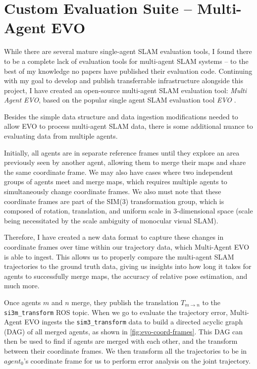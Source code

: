 \section{Custom Evaluation Suite – Multi-Agent EVO}
\label{sec:multi-agent-evo}
While there are several mature single-agent SLAM evaluation tools, I found there to be a complete lack of evaluation tools for multi-agent SLAM systems – to the best of my knowledge no papers have published their evaluation code. Continuing with my goal to develop and publish transferrable infrastructure alongside this project, I have created an open-source multi-agent SLAM evaluation tool: \textit{Multi Agent EVO}, based on the popular single agent SLAM evaluation tool \textit{EVO} \autocite{grupp2017evo}.

Besides the simple data structure and data ingestion modifications needed to allow EVO to process multi-agent SLAM data, there is some additional nuance to evaluating data from multiple agents.

Initially, all agents are in separate reference frames until they explore an area previously seen by another agent, allowing them to merge their maps and share the same coordinate frame. We may also have cases where two independent groups of agents meet and merge maps, which requires multiple agents to simultaneously change coordinate frames. We also must note that these coordinate frames are part of the SIM(3) transformation group, which is composed of rotation, translation, and uniform scale in 3-dimensional space (scale being necessitated by the scale ambiguity of monocular visual SLAM).

Therefore, I have created a new data format to capture these changes in coordinate frames over time within our trajectory data, which Multi-Agent EVO is able to ingest. This allows us to properly compare the multi-agent SLAM trajectories to the ground truth data, giving us insights into how long it takes for agents to successfully merge maps, the accuracy of relative pose estimation, and much more.

Once agents $m$ and $n$ merge, they publish the translation $T_{m \to n}$ to the \texttt{si3m\_transform} ROS topic. When we go to evaluate the trajectory error, Multi-Agent EVO ingests the \texttt{sim3\_transform} data to build a directed acyclic graph (DAG) of all merged agents, as shown in \autoref{fig:evo-coord-frames}. This DAG can then be used to find if agents are merged with each other, and the transform between their coordinate frames. We then transform all the trajectories to be in $agent_0$'s coordinate frame for us to perform error analysis on the joint trajectory.

